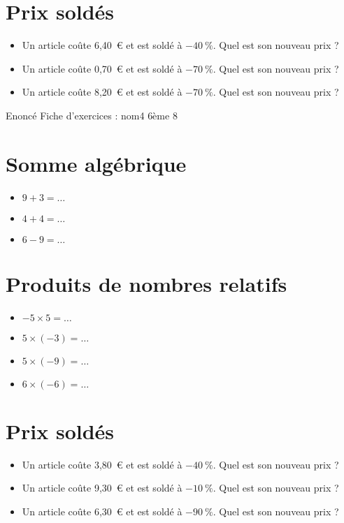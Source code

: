 \documentclass[a4paper,11pt,fleqn]{article}
\begin{document}
\section{Prix soldés}
\begin{itemize}

  \item Un article coûte 6,40~€ et est soldé à $-40~\%$. Quel est son nouveau prix ?
  \item Un article coûte 0,70~€ et est soldé à $-70~\%$. Quel est son nouveau prix ?
  \item Un article coûte 8,20~€ et est soldé à $-70~\%$. Quel est son nouveau prix ?
\end{itemize}
\newpage
\setcounter{exo}{0}
\setcounter{section}{0}
{Enoncé} \hfill {\huge Fiche d'exercices  : nom4} \hfill {6ème 8}

\section{Somme algébrique}
\begin{itemize}

  \item $9 +3=\ldots$
  \item $4 +4=\ldots$
  \item $6 -9=\ldots$
\end{itemize}


\section{Produits de nombres relatifs}
\begin{itemize}

  \item $-5\times5=\ldots$
  \item $5\times(-3)=\ldots$
  \item $5\times(-9)=\ldots$
  \item $6\times(-6)=\ldots$
\end{itemize}


\section{Prix soldés}
\begin{itemize}

  \item Un article coûte 3,80~€ et est soldé à $-40~\%$. Quel est son nouveau prix ?
  \item Un article coûte 9,30~€ et est soldé à $-10~\%$. Quel est son nouveau prix ?
  \item Un article coûte 6,30~€ et est soldé à $-90~\%$. Quel est son nouveau prix ?
\end{itemize}
\end{document}
